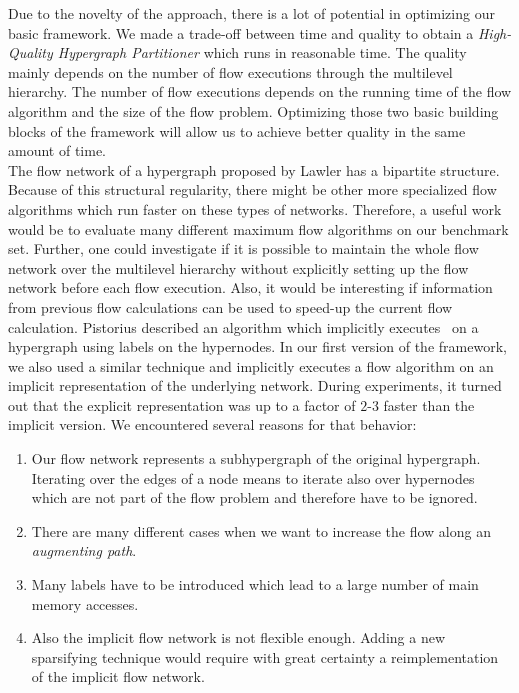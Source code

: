 Due to the novelty of the approach, there is a lot of potential in optimizing our basic 
framework. We made a trade-off between time and quality to obtain a \emph{High-Quality 
Hypergraph Partitioner} which runs in reasonable time. The quality mainly depends
on the number of flow executions through the multilevel hierarchy. The number of flow
executions depends on the running time of the flow algorithm and the size of the flow
problem. Optimizing those two basic building blocks of the framework will allow us to
achieve better quality in the same amount of time.\\
The flow network of a hypergraph proposed by Lawler \cite{lawler1973} has a bipartite 
structure. Because of this structural regularity, there might be other more specialized
flow algorithms which run faster on these types of networks. Therefore, a useful work 
would be to evaluate many different maximum flow algorithms on our benchmark set. Further,
one could investigate if it is possible to maintain the whole flow network over the
multilevel hierarchy without explicitly setting up the flow network before each flow
execution. Also, it would be interesting if information from previous flow calculations can 
be used to speed-up the current flow calculation. Pistorius \cite{pistorius2003} described
an algorithm which implicitly executes \EdmondKarp~on a hypergraph using
labels on the hypernodes. In our first version of the framework, we also used a similar 
technique and implicitly executes a flow algorithm on an implicit representation of 
the underlying network. During experiments, it turned out that the explicit representation
was up to a factor of $2$-$3$ faster than the implicit version. We encountered several reasons
for that behavior: 
\begin{enumerate}
\item Our flow network represents a subhypergraph of the original hypergraph. Iterating 
      over the edges of a node means to iterate also over hypernodes which are not part of 
      the flow problem and therefore have to be ignored.
\item There are many different cases when we want to increase the flow along an 
      \emph{augmenting path}.
\item Many labels have to be introduced which lead to a large number of 
      main memory accesses.
\item Also the implicit flow network is not flexible enough. Adding a new sparsifying
      technique would require with great certainty a reimplementation of the implicit flow network.
\end{enumerate}

